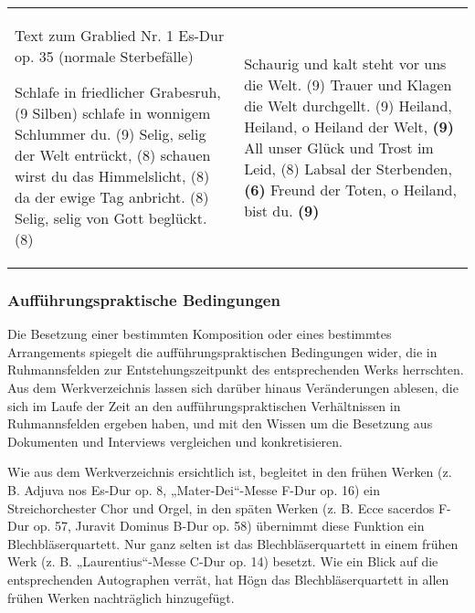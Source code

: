 \documentclass[a4paper]{article}
\begin{document}
\begin{flushleft}
\tablefirsthead{}
\tablehead{}
\tabletail{}
\tablelasttail{}
\begin{supertabular}{m{7.9230003cm}m{7.9230003cm}}
Text zum Grablied Nr. 1 Es-Dur op. 35 (normale Sterbefälle)

Schlafe in friedlicher Grabesruh, (9 Silben)\newline
schlafe in wonnigem Schlummer du. (9)\newline
Selig, selig der Welt entrückt, (8)\newline
schauen wirst du das Himmelslicht, (8)\newline
da der ewige Tag anbricht. (8)\newline
Selig, selig von Gott beglückt. (8) &
Schaurig und kalt steht vor uns die Welt. (9)\newline
Trauer und Klagen die Welt durchgellt. (9)\newline
Heiland, Heiland, o Heiland der Welt, \textbf{(9)}\newline
All unser Glück und Trost im Leid, (8)\newline
Labsal der Sterbenden, \textbf{(6)}\newline
Freund der Toten, o Heiland, bist du. \textbf{(9)}\\
\end{supertabular}
\end{flushleft}
\subsubsection{Aufführungspraktische Bedingungen}
\hypertarget{RefHeadingToc100333744}{}Die Besetzung einer bestimmten
Komposition oder eines bestimmtes Arrangements spiegelt die
aufführungspraktischen Bedingungen wider, die in Ruhmannsfelden zur
Entstehungszeitpunkt des entsprechenden Werks herrschten. Aus dem
Werkverzeichnis lassen sich darüber hinaus Veränderungen ablesen, die
sich im Laufe der Zeit an den aufführungspraktischen Verhältnissen in
Ruhmannsfelden ergeben haben, und mit den Wissen um die Besetzung aus
Dokumenten und Interviews vergleichen und konkretisieren. 

Wie aus dem Werkverzeichnis ersichtlich ist, begleitet in den frühen
Werken (z. B. Adjuva nos Es-Dur op. 8, „Mater-Dei“-Messe F-Dur op. 16)
ein Streichorchester Chor und Orgel, in den späten Werken (z. B. Ecce
sacerdos F-Dur op. 57, Juravit Dominus B-Dur op. 58) übernimmt diese
Funktion ein Blechbläserquartett. Nur ganz selten ist das
Blechbläserquartett in einem frühen Werk (z. B. „Laurentius“-Messe
C-Dur op. 14) besetzt. Wie ein Blick auf die entsprechenden Autographen
verrät, hat Högn das Blechbläserquartett in allen frühen Werken
nachträglich hinzugefügt.
\end{document}
